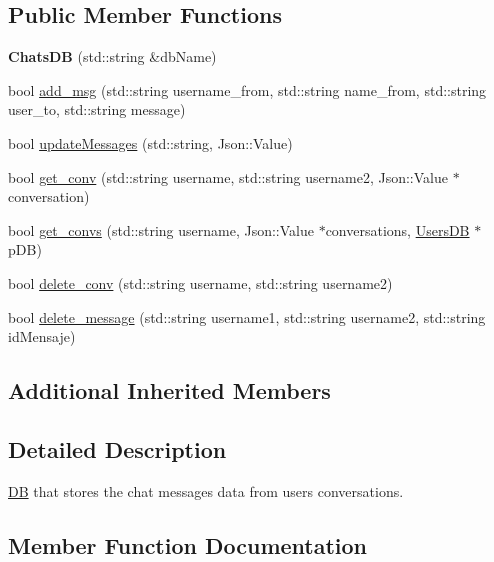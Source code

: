 \subsection*{Public Member Functions}
\begin{DoxyCompactItemize}
\item 
{\bfseries Chats\+DB} (std\+::string \&db\+Name)\hypertarget{classChatsDB_ac3bbf89572923a92cb1ff9b792c6d1c9}{}\label{classChatsDB_ac3bbf89572923a92cb1ff9b792c6d1c9}

\item 
bool \hyperlink{classChatsDB_a0c7faaba32d188a85f84be4691efa0d6}{add\+\_\+msg} (std\+::string username\+\_\+from, std\+::string name\+\_\+from, std\+::string user\+\_\+to, std\+::string message)
\item 
bool \hyperlink{classChatsDB_a05ea195c16303f526298b754d48c3758}{update\+Messages} (std\+::string, Json\+::\+Value)
\item 
bool \hyperlink{classChatsDB_a976b7d969fd6e85faf145e5bb5744b63}{get\+\_\+conv} (std\+::string username, std\+::string username2, Json\+::\+Value $\ast$conversation)
\item 
bool \hyperlink{classChatsDB_a916b0f127080bc573e2c7b71cb2a1a62}{get\+\_\+convs} (std\+::string username, Json\+::\+Value $\ast$conversations, \hyperlink{classUsersDB}{Users\+DB} $\ast$p\+DB)
\item 
bool \hyperlink{classChatsDB_a73a2b8f7e85ea4df47d1b7fac2d050d5}{delete\+\_\+conv} (std\+::string username, std\+::string username2)
\item 
bool \hyperlink{classChatsDB_a9bbe399ab9fea2b3d9e4b913de723240}{delete\+\_\+message} (std\+::string username1, std\+::string username2, std\+::string id\+Mensaje)
\end{DoxyCompactItemize}
\subsection*{Additional Inherited Members}


\subsection{Detailed Description}
\hyperlink{classDB}{DB} that stores the chat messages data from users conversations. 

\subsection{Member Function Documentation}
